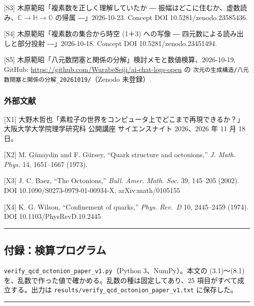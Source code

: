 \documentclass[
  a4paper,
]{ltjsarticle}
\begin{document}
{[}S3{]} 木原範昭「複素数を正しく理解していたか ―
振幅はどこに住むか、虚数読み、\(\mathbb{C} \to \mathbb{H} \to \mathbb{O}\)
の帰属 ―」2026-10-23. Concept DOI 10.5281/zenodo.23585436.

{[}S4{]} 木原範昭「複素数の集合から時空 (1＋3) への写像 ―
四元数による読み出しと部分投射 ―」2026-10-18. Concept DOI
10.5281/zenodo.23451494.

{[}S5{]}
木原範昭「八元数閉塞と関係の分解」検討メモと数値検算、2026-10-19.
GitHub: \url{https://github.com/WurabeSeiji/ai-chat-logs-open} の
\texttt{次元の生成構造/\allowbreak{}八元数閉塞と関係の分解\_\allowbreak{}20261019/\allowbreak{}}（Zenodo
未登録）.

\subsubsection{外部文献}\label{ux5916ux90e8ux6587ux732e}

{[}X1{]}
大野木哲也「素粒子の世界をコンピュータ上でどこまで再現できるか？」大阪大学大学院理学研究科
公開講座 サイエンスナイト 2026、2026 年 11 月 18 日。

{[}X2{]} M. Günaydin and F. Gürsey, ``Quark structure and octonions,''
\emph{J. Math. Phys.} 14, 1651--1667 (1973).

{[}X3{]} J. C. Baez, ``The Octonions,'' \emph{Bull. Amer. Math. Soc.}
39, 145--205 (2002). DOI 10.1090/S0273-0979-01-00934-X.
arXiv:math/0105155

{[}X4{]} K. G. Wilson, ``Confinement of quarks,'' \emph{Phys. Rev.~D}
10, 2445--2459 (1974). DOI 10.1103/PhysRevD.10.2445

\begin{center}\rule{0.5\linewidth}{0.5pt}\end{center}

\subsection{付録：検算プログラム}\label{ux4ed8ux9332ux691cux7b97ux30d7ux30edux30b0ux30e9ux30e0}

\texttt{verify\_\allowbreak{}qcd\_\allowbreak{}octonion\_\allowbreak{}paper\_\allowbreak{}v1.py}（Python 3、NumPy）。本文の
(3.1)〜(8.1) を、乱数で作った値で確かめる。乱数の種は固定してあり、25
項目がすべて成立する。出力は
\texttt{results/\allowbreak{}verify\_\allowbreak{}qcd\_\allowbreak{}octonion\_\allowbreak{}paper\_\allowbreak{}v1.txt} に保存した。

\begin{center}\rule{0.5\linewidth}{0.5pt}\end{center}
\end{document}
